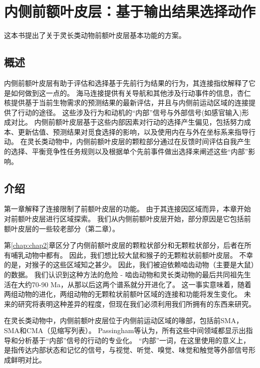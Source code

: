 \chapter{内侧前额叶皮层：基于输出结果选择动作} \label{chap:chap3}

这本书提出了关于灵长类动物前额叶皮层基本功能的方案。



\section{概述}
内侧前额叶皮层有助于评估和选择基于先前行为结果的行为，其连接指纹解释了它是如何做到这一点的。
海马连接提供有关导航和其他涉及行动事件的信息，杏仁核提供基于当前生物需求的预测结果的最新评估，并且与内侧前运动区域的连接提供了行动的途径。
这些涉及行为和动机的“内部”信号与外部信号(如感官输入)形成对比。
内侧前额叶皮层基于这些内部因素对行动的选择产生偏见，包括努力成本、更新估值、预测结果对觅食选择的影响，以及使用内在与外在坐标系来指导行动。
在灵长类动物中，内侧前额叶皮层的颗粒部分通过在反馈时间评估自我产生的选择、平衡竞争性任务规则以及根据单个先前事件做出选择来阐述这些“内部”影响。\par



\section{介绍}

第一章解释了连接限制了前额叶皮层的功能。
由于其连接因区域而异，本章开始对前额叶皮层进行区域探索。
我们从内侧前额叶皮层开始，部分原因是它包括前额叶皮层的一些较老部分（第二章）。\par

第\ref{chap:chap2}章区分了内侧前额叶皮层的颗粒状部分和无颗粒状部分，后者在所有哺乳动物中都有。
因此，我们想比较大鼠和猴子的无颗粒状前额叶皮层。
不幸的是，对猴子的这些区域知之甚少。
因此，我们被迫依赖啮齿动物（主要是大鼠）的数据。
我们认识到这种方法的危险 - 啮齿动物和灵长类动物的最后共同祖先生活在大约70-90 Ma，从那以后这两个谱系就分开进化了。
这一事实意味着，随着两组动物的进化，两组动物的无颗粒状前额叶区域的连接和功能将发生变化。
未来的研究将表明这种差异的程度，但现在我们必须利用我们所拥有的东西来研究。\par


在灵长类动物中，内侧前额叶皮层位于内侧前运动区域的喙部，包括前SMA，SMA和CMA（见缩写列表）。
Passingham等\cite{passingham2010medial}认为，所有这些中间领域都显示出指导和分析基于“内部”信号的行动的专业化。
“内部”一词，在这里使用的意义上，是指传达内部状态和记忆的信号，与视觉、听觉、嗅觉、味觉和触觉等外部信号形成鲜明对比。



